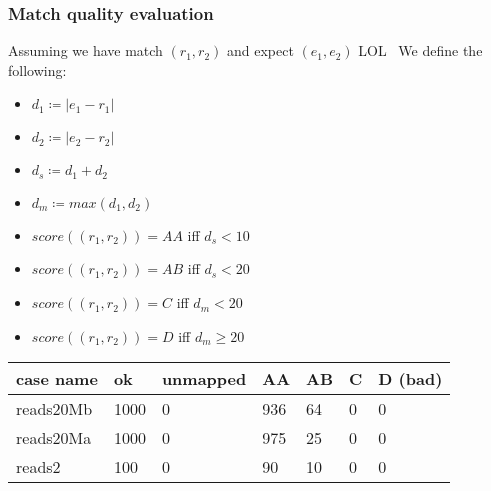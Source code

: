 \documentclass{beamer}
\begin{document}
\begin{frame}
  \frametitle{Match quality evaluation}

  Assuming we have match $(r_1, r_2)$ and expect $(e_1, e_2)$
  LOL~\nocite{wombat2016}
  We define the following:

  \begin{itemize}
    \item $d_1 \coloneqq |e_1 - r_1|$
    \item $d_2 \coloneqq |e_2 - r_2|$
    \item $d_s \coloneqq d_1 + d_2$
    \item $d_m \coloneqq max(d_1, d_2)$
  \end{itemize}

  \begin{itemize}
    \item $score((r_1, r_2)) = AA$ iff $d_s < 10$
    \item $score((r_1, r_2)) = AB$ iff $d_s < 20$
    \item $score((r_1, r_2)) = C$ iff $d_m < 20$
    \item $score((r_1, r_2)) = D$ iff $d_m \geq 20$
  \end{itemize}

  
  \begin{table}[]
    \begin{tabular}{|l|l|l|l|l|l|l|}
    \hline
    case name                        & ok                          & unmapped                 & AA                         & AB                        & C                        & D (bad)                  \\ \hline
    \rowcolor[HTML]{333333} 
    {\color[HTML]{FFFFFF} reads20Mb} & {\color[HTML]{FFFFFF} 1000} & {\color[HTML]{FFFFFF} 0} & {\color[HTML]{FFFFFF} 936} & {\color[HTML]{FFFFFF} 64} & {\color[HTML]{FFFFFF} 0} & {\color[HTML]{FFFFFF} 0} \\ \hline
    \rowcolor[HTML]{FFFFFF} 
    {\color[HTML]{333333} reads20Ma} & {\color[HTML]{333333} 1000} & {\color[HTML]{333333} 0} & {\color[HTML]{333333} 975} & {\color[HTML]{333333} 25} & {\color[HTML]{333333} 0} & {\color[HTML]{333333} 0} \\ \hline
    \rowcolor[HTML]{333333} 
    {\color[HTML]{DAE8FC} reads2}    & {\color[HTML]{DAE8FC} 100}  & {\color[HTML]{DAE8FC} 0} & {\color[HTML]{DAE8FC} 90}  & {\color[HTML]{DAE8FC} 10} & {\color[HTML]{DAE8FC} 0} & {\color[HTML]{DAE8FC} 0} \\ \hline
    \end{tabular}
  
  \end{table}

\end{frame}
\end{document}
